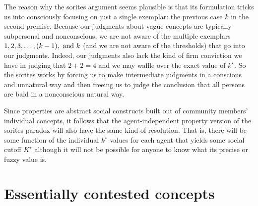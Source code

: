 The reason why the sorites argument seems plausible is that its formulation tricks us into consciously focusing on just a single exemplar: the previous case $k$ in the second premise. Because our judgments about vague concepts are typically subpersonal and nonconscious, we are not aware of the multiple exemplars $1, 2, 3, \ldots, (k - 1),\ \hbox{and}\ k$ (and we are not aware of the thresholds) that go into our judgments. Indeed, our judgments also lack the kind of firm conviction we have in judging that $2 + 2 = 4$ and we may waffle over the exact value of $k^\star$. So the sorites works by forcing us to make intermediate judgments in a conscious and unnatural way and then freeing us to judge the conclusion that all persons are bald in a nonconscious natural way.

Since properties are abstract social constructs built out of community members' individual concepts, it follows that the agent-independent property version of the sorites paradox will also have the same kind of resolution. That is, there will be some function of the individual $k^\star$ values for each agent that yields some social cutoff $K^\star$ although it will not be possible for anyone to know what its precise or fuzzy value is.



\section{Essentially contested concepts} \label{sec:essentially contested concepts}

